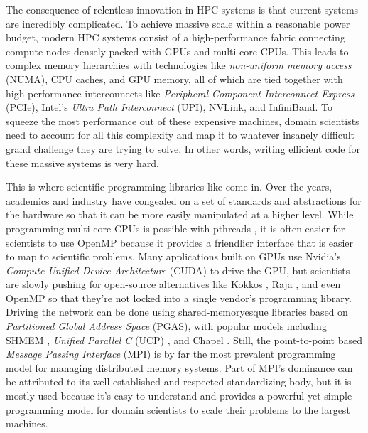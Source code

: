 The consequence of relentless innovation in HPC systems is that current systems are incredibly complicated.
To achieve massive scale within a reasonable power budget, modern HPC systems consist of a high-performance fabric connecting compute nodes densely packed with GPUs and multi-core CPUs.
This leads to complex memory hierarchies with technologies like \textit{non-uniform memory access} (NUMA), CPU caches, and GPU memory, all of which are tied together with high-performance interconnects like \textit{Peripheral Component Interconnect Express} (PCIe), Intel's \textit{Ultra Path Interconnect} (UPI), NVLink, and InfiniBand.
To squeeze the most performance out of these expensive machines, domain scientists need to account for all this complexity and map it to whatever insanely difficult grand challenge they are trying to solve.
In other words, writing efficient code for these massive systems is very hard.

This is where scientific programming libraries like come in.
Over the years, academics and industry have congealed on a set of standards and abstractions for the hardware so that it can be more easily manipulated at a higher level.
While programming multi-core CPUs is possible with pthreads \cite{pthreads}, it is often easier for scientists to use OpenMP \cite{OpenMP} because it provides a friendlier interface that is easier to map to scientific problems.
Many applications built on GPUs use Nvidia's \textit{Compute Unified Device Architecture} (CUDA) \cite{CUDA} to drive the GPU, but scientists are slowly pushing for open-source alternatives like Kokkos \cite{kokkos}, Raja \cite{Raja}, and even OpenMP so that they're not locked into a single vendor's programming library.
Driving the network can be done using shared-memoryesque libraries based on \textit{Partitioned Global Address Space} (PGAS), with popular models including SHMEM \cite{OpenSHMEM}, \textit{Unified Parallel C} (UCP) \cite{UPC}, and Chapel \cite{Chapel}. Still, the point-to-point based \textit{Message Passing Interface} (MPI) \cite{mpi40} is by far the most prevalent programming model for managing distributed memory systems.
Part of MPI's dominance can be attributed to its well-established and respected standardizing body, but it is mostly used because it's easy to understand and provides a powerful yet simple programming model for domain scientists to scale their problems to the largest machines. 

